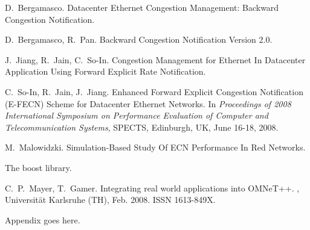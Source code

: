 \documentclass{sig-alternate-ipsn13}
\begin{document}
\begin{thebibliography}{10}
D.~Bergamasco.
\newblock Datacenter Ethernet Congestion Management: Backward Congestion Notification.

D.~Bergamasco, R.~Pan.
\newblock Backward Congestion Notification Version 2.0.

J.~Jiang, R.~Jain, C.~So-In.
\newblock Congestion Management for Ethernet In Datacenter Application Using Forward Explicit Rate Notification.

C.~So-In, R.~Jain, J.~Jiang.
\newblock Enhanced Forward Explicit Congestion Notification (E-FECN) Scheme for Datacenter Ethernet Networks.
\newblock In {\em Proceedings of 2008 International Symposium on Performance Evaluation of Computer and Telecommunication Systems}, 
SPECTS, Edinburgh, UK, June 16-18, 2008.

M.~Malowidzki.
\newblock Simulation-Based Study Of ECN Performance In Red Networks.

\newblock The boost library.


C.~P.~Mayer, T.~Gamer.
\newblock Integrating real world applications into OMNeT++.
, Universit\"{a}t Karlsruhe (TH), Feb. 2008. ISSN 1613-849X.


\end{thebibliography}


%
%
\appendix

Appendix goes here.

\end{document}
